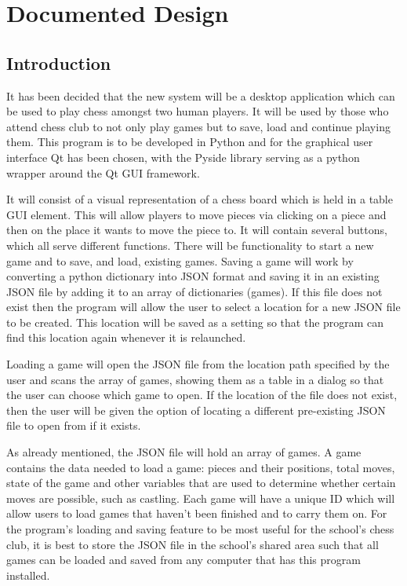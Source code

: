 \chapter{Documented Design}
\section{Introduction}
It has been decided that the new system will be a desktop application which can be used to play chess amongst two human players. It will be used by those who attend chess club to not only play games but to save, load and continue playing them. This program is to be developed in Python and for the graphical user interface Qt has been chosen, with the Pyside library serving as a python wrapper around the Qt GUI framework. 

It will consist of a visual representation of a chess board which is held in a table GUI element. This will allow players to move pieces via clicking on a piece and then on the place it wants to move the piece to. It  will contain several buttons, which all serve different functions. There will be functionality to start a new game and to save, and load, existing games. Saving a game will work by converting a python dictionary into JSON format and saving it in an existing JSON file by adding it to an array of dictionaries (games). If this file does not exist then the program will allow the user to select a location for a new JSON file to be created. This location will be saved as a setting so that the program can find this location again whenever it is relaunched.

Loading a game will open the JSON file from the location path specified by the user and scans the array of games, showing them as a table in a dialog so that the user can choose which game to open. If the location of the file does not exist, then the user will be given the option of locating a different pre-existing JSON file to open from if it exists.

As already mentioned, the JSON file will hold an array of games. A game contains the data needed to load a game: pieces and their positions, total moves, state of the game and other variables that are used to determine whether certain moves are possible, such as castling. Each game will have a unique ID which will allow users to load games that haven't been finished and to carry them on. For the program's loading and saving feature to be most useful for the school's chess club, it is best to store the JSON file in the school's shared area such that all games can be loaded and saved from any computer that has this program installed.
